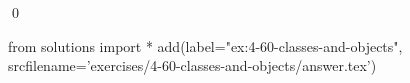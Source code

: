
\begin{ex}
  \label{ex:4-60-classes-and-objects}
  
  \qed
\end{ex}
\begin{python0}
from solutions import *
add(label="ex:4-60-classes-and-objects",
    srcfilename='exercises/4-60-classes-and-objects/answer.tex')
\end{python0}
